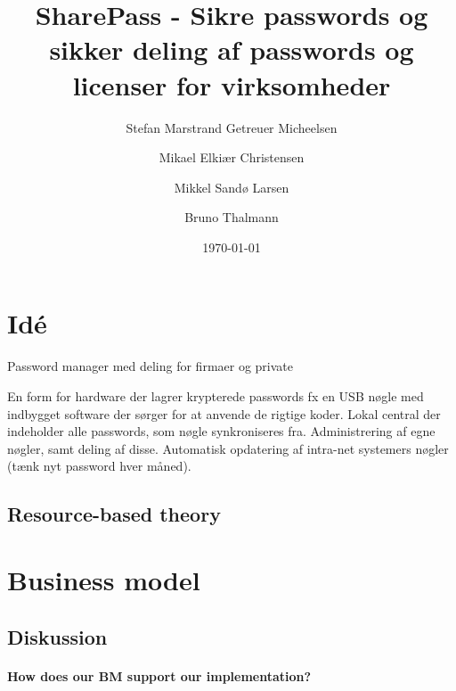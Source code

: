 \documentclass[a4paper]{article}
\title{SharePass - Sikre passwords og sikker deling af passwords og licenser for virksomheder}
\author{Stefan Marstrand Getreuer Micheelsen \and Mikael Elkiær Christensen \and Mikkel Sandø Larsen \and Bruno Thalmann}
\date{\today}
\begin{document}
\maketitle
\listoftodos


\section{Idé}
Password manager med deling for firmaer og private

En form for hardware der lagrer krypterede passwords fx en USB nøgle med indbygget software der sørger for at anvende de rigtige koder.
Lokal central der indeholder alle passwords, som nøgle synkroniseres fra.
Administrering af egne nøgler, samt deling af disse.
Automatisk opdatering af intra-net systemers nøgler (tænk nyt password hver måned).





\subsection{Resource-based theory}




\section{Business model}

\subsection{Diskussion}

\paragraph{How does our BM support our implementation?}
\end{document}
